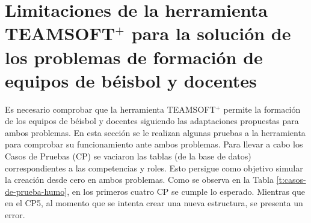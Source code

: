 \section{Limitaciones de la herramienta TEAMSOFT$^+$ para la solución de los problemas de formación de equipos de béisbol y docentes} \label{sec:limitaciones}

Es necesario comprobar que la herramienta TEAMSOFT$^+$ permite la formación de los equipos de béisbol y docentes siguiendo las adaptaciones propuestas para ambos problemas. En esta sección se le realizan algunas pruebas a la herramienta para comprobar su funcionamiento ante ambos problemas. Para llevar a cabo los Casos de Pruebas (CP) se vaciaron las tablas (de la base de datos) correspondientes a las competencias y roles. Esto persigue como objetivo simular la creación desde cero en ambos problemas. Como se observa en la Tabla \ref{t:casos-de-prueba-humo}, en los primeros cuatro CP se cumple lo esperado. Mientras que en el CP5, al momento que se intenta crear una nueva estructura, se presenta un error.

